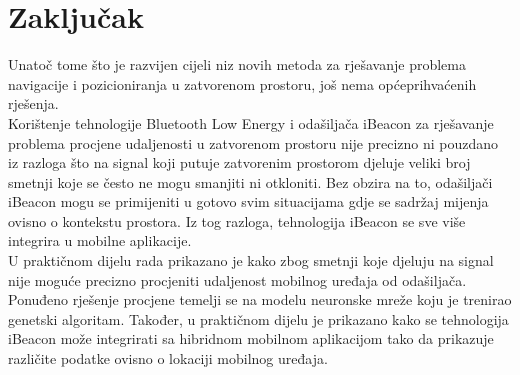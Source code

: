 \chapter{Zaključak}
\label{chap:zakljucak}

Unatoč tome što je razvijen cijeli niz novih metoda za rješavanje problema navigacije i pozicioniranja u zatvorenom prostoru, još nema općeprihvaćenih rješenja. 
\\
Korištenje tehnologije Bluetooth Low Energy i odašiljača iBeacon za rješavanje problema procjene udaljenosti u zatvorenom prostoru nije precizno ni pouzdano iz razloga što na signal koji putuje zatvorenim prostorom djeluje veliki broj smetnji koje se često ne mogu smanjiti ni otkloniti. 
Bez obzira na to, odašiljači iBeacon mogu se primijeniti u gotovo svim situacijama gdje se sadržaj mijenja ovisno o kontekstu prostora. 
Iz tog razloga, tehnologija iBeacon se sve više integrira u mobilne aplikacije.
\\

U praktičnom dijelu rada prikazano je kako zbog smetnji koje djeluju na signal nije moguće precizno procjeniti udaljenost mobilnog uređaja od odašiljača. 
Ponuđeno rješenje procjene temelji se na modelu neuronske mreže koju je trenirao genetski algoritam. 
Također, u praktičnom dijelu je prikazano kako se tehnologija iBeacon može integrirati sa hibridnom mobilnom aplikacijom tako da prikazuje različite podatke ovisno o lokaciji mobilnog uređaja. 
